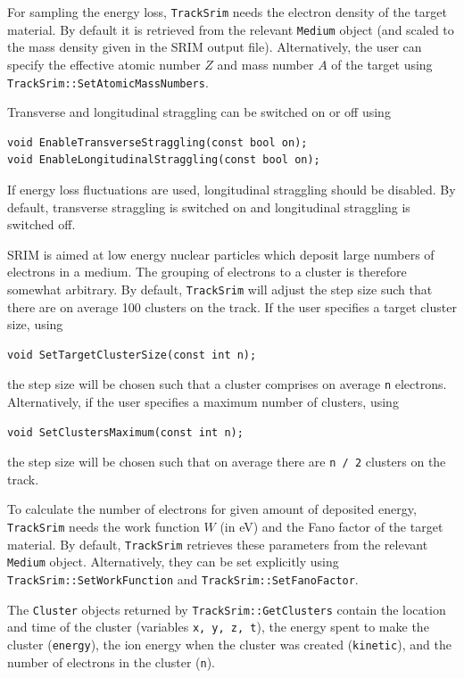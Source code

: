 For sampling the energy loss, \texttt{TrackSrim} needs the 
electron density of the target material. By default it is retrieved 
from the relevant \texttt{Medium} object (and scaled to the mass density 
given in the SRIM output file). 
Alternatively, the user can specify the effective atomic number $Z$ 
and mass number $A$ of the target 
using \texttt{TrackSrim::SetAtomicMassNumbers}.


Transverse and longitudinal straggling can be switched on or off using
\begin{lstlisting}
void EnableTransverseStraggling(const bool on);
void EnableLongitudinalStraggling(const bool on);
\end{lstlisting}
If energy loss fluctuations are used, longitudinal straggling should be disabled.
By default, transverse straggling is switched on and longitudinal straggling 
is switched off. 

SRIM is aimed at low energy nuclear particles which deposit large numbers of electrons in a medium. 
The grouping of electrons to a cluster is therefore somewhat arbitrary. 
By default, \texttt{TrackSrim} will adjust the step size such that 
there are on average 100 clusters on the track.
If the user specifies a target cluster size, using
\begin{lstlisting}
void SetTargetClusterSize(const int n);
\end{lstlisting}
the step size will be chosen such that a cluster comprises on average 
\texttt{n} electrons. Alternatively, if the user specifies a maximum 
number of clusters, using
\begin{lstlisting}
void SetClustersMaximum(const int n);
\end{lstlisting}
the step size will be chosen such that on average there are 
\texttt{n / 2} clusters on the track.

To calculate the number of electrons for given amount of deposited energy,
\texttt{TrackSrim} needs the work function $W$ (in eV) and the 
Fano factor of the target material. 
By default, \texttt{TrackSrim} retrieves these parameters from the 
relevant \texttt{Medium} object.
Alternatively, they can be set explicitly using 
\texttt{TrackSrim::SetWorkFunction} and \texttt{TrackSrim::SetFanoFactor}.

The \texttt{Cluster} objects returned by \texttt{TrackSrim::GetClusters} 
contain the location and time of the cluster (variables \texttt{x, y, z, t}), the energy spent to make the cluster (\texttt{energy}), the ion energy when the cluster was created (\texttt{kinetic}), and the number of electrons in the cluster (\texttt{n}). 

